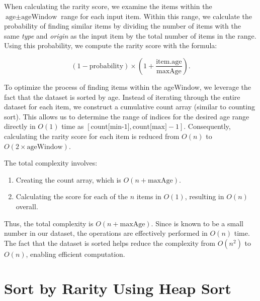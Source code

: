 When calculating the rarity score, we examine the items within the \( \text{age} \pm \text{ageWindow} \) range for each input item. Within this range, we calculate the probability of finding similar items by dividing the number of items with the same \textit{type} and \textit{origin} as the input item by the total number of items in the range. Using this probability, we compute the rarity score with the formula:  

\[
(1 - \text{probability}) \times \left( 1 + \frac{\text{item.age}}{\text{maxAge}} \right).
\]  

To optimize the process of finding items within the ageWindow, we leverage the fact that the dataset is sorted by age. Instead of iterating through the entire dataset for each item, we construct a cumulative count array (similar to counting sort). This allows us to determine the range of indices for the desired age range directly in \( O(1) \) time as \([ \text{count[min-1]}, \text{count[max]}-1 ]\). Consequently, calculating the rarity score for each item is reduced from \( O(n) \) to \( O(2 \times \text{ageWindow}) \).  

The total complexity involves:  
\begin{enumerate}
    \item Creating the count array, which is \( O(n + \text{maxAge}) \).  
    \item Calculating the score for each of the \( n \) items in \( O(1) \), resulting in \( O(n) \) overall.  
\end{enumerate}

Thus, the total complexity is \( O(n + \text{maxAge}) \). Since  is known to be a small number in our dataset, the operations are effectively performed in \( O(n) \) time. The fact that the dataset is sorted helps reduce the complexity from \( O(n^2) \) to \( O(n) \), enabling efficient computation.  

\section{Sort by Rarity Using Heap Sort}

